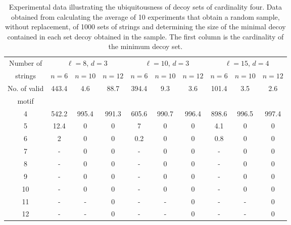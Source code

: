 \begin{table}[th]
\begin{center} {\footnotesize
\begin{tabular}{|c||c|c|c||c|c|c||c|c|c|}
\hline
Number of 			& \multicolumn{3}{c||}{$\ell = 8$, $d = 3$} & \multicolumn{3}{c||}{$\ell = 10$, $d = 3$}  & \multicolumn{3}{c|}{$\ell = 15$, $d = 4$} \\
strings 	& \multicolumn{1}{c|}{$n = 6$} & \multicolumn{1}{c|}{$n = 10$} & \multicolumn{1}{c||}{$n = 12$} 
					& \multicolumn{1}{c|}{$n = 6$} & \multicolumn{1}{c|}{$n = 10$} & \multicolumn{1}{c||}{$n = 12$}  
    				& \multicolumn{1}{c|}{$n = 6$} & \multicolumn{1}{c|}{$n = 10$} & \multicolumn{1}{c||}{$n = 12$} \\
\hline
\hline
No. of valid &	443.4	&	4.6 &	88.7 &	394.4 & 9.3 & 3.6 & 101.4 & 3.5 & 2.6 \\
motif &&&&&&&&& \\
\hline
\hline
 4 		& 542.2    & 995.4  	& 991.3  	& 605.6 	& 990.7 	&  996.4 		& 898.6 	& 996.5 	&  997.4  	\\
 5  		& 12.4     	& 0 			& 0   	 	& 7  			&  0  		&  0 				& 4.1  		&  0  		&  0 	\\
 6 		& 2     		& 0   		& 0 			& 0.2  		&  0 			&  0  			& 0.8  		&  0 			&  0  \\
 7    		& -     		& 0   		& 0  			& -  			&  0 			&  0 				& -  			&  0 			&  0 	\\
 8  		& -     		& 0   		& 0  			& -  			&  0 			&  0 				& -  			&  0 			&  0	\\	
 9   		& -     		& 0   		& 0  			& -  			&  0 			&  0 				& -  			&  0 			&  0	\\	
 10    	& -     		& 0  			& 0   		& -  			&  0 			&  0 				& -  			&  0  		&  0	\\
 11    	& -     		& -  			& 0   		& -  			&  -			&  0 				& -  			&  - 			&  0	\\
 12       & -     		& -  			& 0  			& -  			&  -			&  0    			& -  			&  - 			&  0	\\
\hline
\end{tabular} }
\end{center}
\caption[Experimental data illustrating the ubiquitousness of decoy sets of cardinality four.]{Experimental data illustrating the ubiquitousness of decoy sets of cardinality four. Data obtained from calculating the average of 10 experiments that obtain a random sample, without replacement, of 1000 sets of strings and determining the size of the minimal decoy contained in each set decoy obtained in the sample.  The first column is the cardinality of the minimum decoy set. }
\label{decoy_table}
\end{table} 

